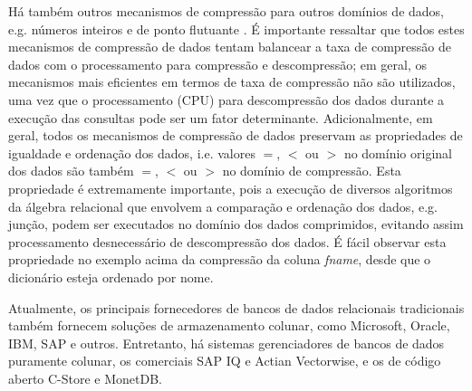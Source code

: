 Há também outros mecanismos de compressão para outros domínios de dados, e.g. números inteiros e de ponto 
flutuante \citep{Abadi2006, Zukowski2006}. É importante ressaltar que todos estes mecanismos de 
compressão de dados tentam balancear a taxa de compressão de dados com o processamento para compressão
e descompressão; em geral, os mecanismos mais eficientes em termos de taxa de compressão não são utilizados,
uma vez que o processamento (CPU) para descompressão dos dados durante a execução das consultas
pode ser um fator determinante. Adicionalmente, em geral, todos os mecanismos de compressão de dados
preservam as propriedades de igualdade e ordenação dos dados, i.e. valores $=$, $<$ ou $>$ no domínio original
dos dados são também $=$, $<$ ou $>$ no domínio de compressão. Esta propriedade é extremamente importante, 
pois a execução de diversos algoritmos da álgebra relacional que envolvem a comparação e ordenação dos
dados, e.g. junção, podem ser executados no domínio dos dados comprimidos, evitando assim processamento 
desnecessário de descompressão dos dados. É fácil observar esta propriedade no exemplo acima da compressão
da coluna \emph{fname}, desde que o dicionário esteja ordenado por nome.

Atualmente, os principais fornecedores de bancos de dados relacionais tradicionais também fornecem 
soluções de armazenamento colunar, como Microsoft, Oracle, IBM, SAP e outros. Entretanto, há sistemas
gerenciadores de bancos de dados puramente colunar, os comerciais SAP IQ e Actian Vectorwise, e os
de código aberto C-Store e MonetDB.
  

